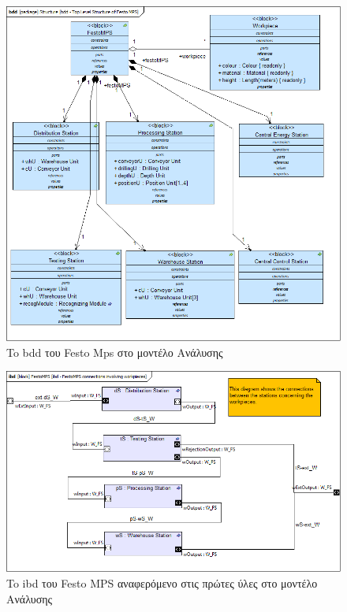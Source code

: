 \documentclass[a4paper,12pt,twoside]{report}
\begin{document}
{\begin{appendices}
			\begin{figure}[hp]
					\centering
					\includegraphics[scale=0.30]{AnalysisModel_bdd-TopLevelStructureofFestoMPS.png}
					\caption{To bdd του Festo Mps στο μοντέλο Ανάλυσης}
					\label{φωτ:To bdd του Festo Mps στο μοντέλο Ανάλυσης}
			\end{figure}
			
			\begin{figure}[hp]
					\centering
					\includegraphics[scale=0.30]{AnalysisModel_ibd-FestoMPSconnectionsinvolvingworkpieces.png}
					\caption{To ibd του Festo MPS αναφερόμενο στις πρώτες ύλες στο μοντέλο Ανάλυσης}
					\label{φωτ:To ibd του Festo MPS αναφερόμενο στις πρώτες ύλες στο μοντέλο Ανάλυσης}
			\end{figure}
			

\end{appendices}}
\end{document}
